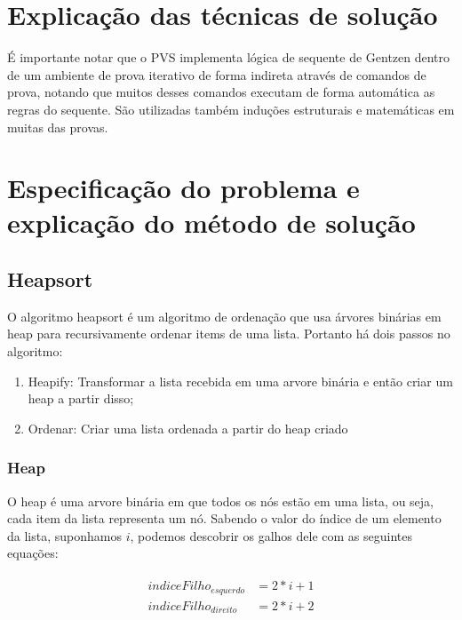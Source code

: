 \chapter{Explicação das técnicas de solução}

É importante notar que o PVS implementa lógica de sequente de Gentzen dentro de um ambiente de prova iterativo de forma indireta através de comandos de prova, notando que muitos desses comandos  executam de forma automática as regras do sequente. São utilizadas também induções estruturais e matemáticas em muitas das provas.


\chapter{Especificação do problema e explicação do método de solução}

\section{Heapsort}

O algoritmo heapsort é um algoritmo de ordenação que usa árvores binárias em heap para recursivamente ordenar items de uma lista. Portanto há dois passos no algoritmo:

\begin{enumerate}
    \item Heapify: Transformar a lista recebida em uma arvore binária e então criar um heap a partir disso;
    \item Ordenar: Criar uma lista ordenada a partir do heap criado
\end{enumerate}

\subsection{Heap}

O heap é uma arvore binária em que todos os nós estão em uma lista, ou seja, cada item da lista representa um nó. Sabendo o valor do índice de um elemento da lista, suponhamos $i$, podemos descobrir os galhos dele com as seguintes equações:

\begin{gather}
\begin{align}
indiceFilho_{esquerdo} &= 2*i+1 \\
indiceFilho_{direito}  &= 2*i+2
\end{align}
\end{gather}

